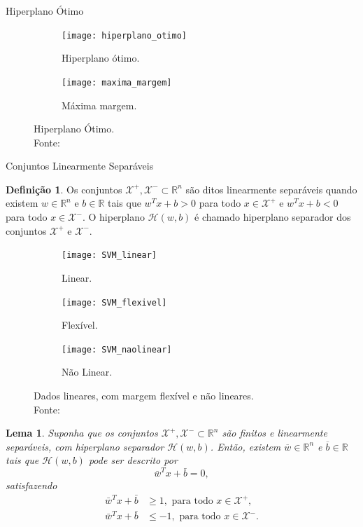 \documentclass{beamer}
\def\Xset{\mathcal{X}}
\def\Hset{\mathcal{H}}
\def\RR{\mathds{R}}
\def\wbar{\bar{w}}
\def\bbar{\bar{b}}
\newtheorem{lema}{Lema}
\theoremstyle{definition}%
\newtheorem{defi}{Definição}
\begin{document}
\begin{frame}{Hiperplano Ótimo}
\begin{figure}[h] 
	\centering
	\begin{subfigure}[h]{0.4\textwidth}
		\centering
		\texttt{[image: hiperplano\_otimo]}
		\caption{Hiperplano ótimo. \label{fig3:a}}
	\end{subfigure}
	\begin{subfigure}[h]{0.4\textwidth}
		\centering
		\texttt{[image: maxima\_margem]}
		\caption{Máxima margem. \label{fig3:b}}	
	\end{subfigure}
	\caption{Hiperplano Ótimo. \label{fig3}
		\\ Fonte: \textcite{Evelin2017}}
\end{figure}
\end{frame}


\begin{frame}{Conjuntos Linearmente Separáveis}
\begin{defi} \label{def1} Os conjuntos $\Xset^{+}, \Xset^{-} \subset \RR^n$ são ditos linearmente separáveis quando existem $w\in \RR^n$ e $b\in \RR$  tais que $w^{T}x+b>0$ para todo $x\in \Xset^{+}$ e $w^{T}x+b<0$ para todo $x\in \Xset^{-}$. O hiperplano $\Hset(w,b)$ é chamado hiperplano separador dos conjuntos $\Xset^{+}$ e $\Xset^{-}$.
\end{defi}

\begin{figure}[!h] 
	\centering
	\begin{subfigure}[h]{0.25\textwidth}
		\centering
		\texttt{[image: SVM\_linear]}
		\caption{Linear. \label{fig1:a}}
	\end{subfigure}
	\begin{subfigure}[!h]{0.25\textwidth}
		\centering
		\texttt{[image: SVM\_flexivel]}
		\caption{Flexível. \label{fig1:b}}
	\end{subfigure}
	\begin{subfigure}[!h]{0.25\textwidth}
		\centering
		\texttt{[image: SVM\_naolinear]}
		\caption{Não Linear. \label{fig1:c}}
	\end{subfigure}
	\caption{Dados lineares, com margem flexível e não lineares. \label{fig1}\\ Fonte: \textcite{Evelin2017}}
\end{figure}
\end{frame}


\begin{frame}
\begin{lema} \label{lema1} Suponha que os conjuntos $\Xset^{+}, \Xset^{-} \subset \RR^n$ são finitos e linearmente separáveis, com hiperplano separador $\Hset(w,b)$. Então, existem $\overline{w}\in \RR^n$ e $\overline{b}\in \RR$ tais que $\Hset(w,b)$ pode ser descrito por
	\[
	\wbar^{T}x+\bbar =0,
	\]
	satisfazendo
	\begin{align}
	\wbar^{T}x+\bbar &\geq 1, \text{ para todo } x\in \Xset^{+}, \label{eq1} \\
	\wbar^{T}x+\bbar &\leq -1, \text{ para todo } x\in \Xset^{-}. \label{eq2}
	\end{align}
\end{lema} 
\end{frame}
\end{document}
